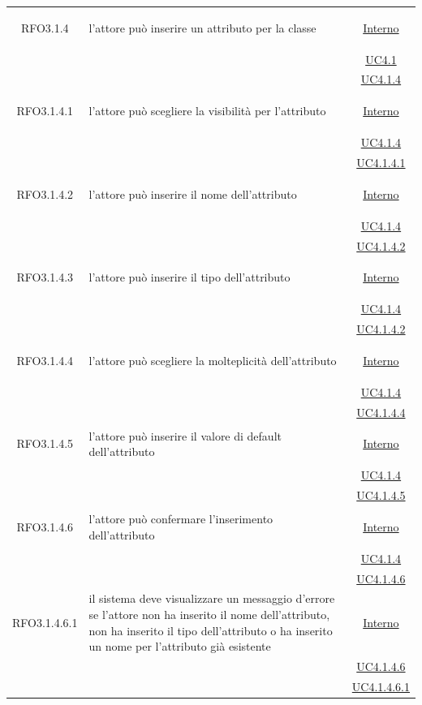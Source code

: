 \begin{longtable}{|c|>{\centering}m{7cm}|c|}
\hypertarget{RFO3.1.4}{RFO3.1.4} & l'attore può inserire un attributo per la classe & \hyperlink{Interno}{Interno}\\
& &\hyperref[UC4.1]{UC4.1}\\
& &\hyperref[UC4.1.4]{UC4.1.4}\\ \hline

\hypertarget{RFO3.1.4.1}{RFO3.1.4.1} & l'attore può scegliere la visibilità per l'attributo &  \hyperlink{Interno}{Interno}\\
& &\hyperref[UC4.1.4]{UC4.1.4}\\
& &\hyperref[UC4.1.4.1]{UC4.1.4.1}\\ \hline

\hypertarget{RFO3.1.4.2}{RFO3.1.4.2} & l'attore può inserire il nome dell'attributo & \hyperlink{Interno}{Interno}\\
& &\hyperref[UC4.1.4]{UC4.1.4}\\
& &\hyperref[UC4.1.4.2]{UC4.1.4.2}\\ \hline

\hypertarget{RFO3.1.4.3}{RFO3.1.4.3} & l'attore può inserire il tipo dell'attributo & \hyperlink{Interno}{Interno}\\
& &\hyperref[UC4.1.4]{UC4.1.4}\\
& &\hyperref[UC4.1.4.2]{UC4.1.4.2}\\ \hline

\hypertarget{RFO3.1.4.4}{RFO3.1.4.4} & l'attore può scegliere la molteplicità dell'attributo & \hyperlink{Interno}{Interno}\\
& &\hyperref[UC4.1.4]{UC4.1.4}\\
& &\hyperref[UC4.1.4.4]{UC4.1.4.4}\\ \hline

\hypertarget{RFO3.1.4.5}{RFO3.1.4.5} & l'attore può inserire il valore di default dell'attributo & \hyperlink{Interno}{Interno}\\
& &\hyperref[UC4.1.4]{UC4.1.4}\\
& &\hyperref[UC4.1.4.5]{UC4.1.4.5}\\ \hline

\hypertarget{RFO3.1.4.6}{RFO3.1.4.6} & l'attore può confermare l'inserimento dell'attributo & \hyperlink{Interno}{Interno}\\
& &\hyperref[UC4.1.4]{UC4.1.4}\\
& &\hyperref[UC4.1.4.6]{UC4.1.4.6}\\ \hline

\hypertarget{RFO3.1.4.6.1}{RFO3.1.4.6.1} & il sistema deve visualizzare un messaggio d'errore se l'attore non ha inserito il nome dell'attributo, non ha inserito il tipo dell'attributo o ha inserito un nome per l'attributo già esistente & \hyperlink{Interno}{Interno}\\
& &\hyperref[UC4.1.4.6]{UC4.1.4.6}\\
& &\hyperref[UC4.1.4.6.1]{UC4.1.4.6.1}\\ \hline


\end{longtable}
